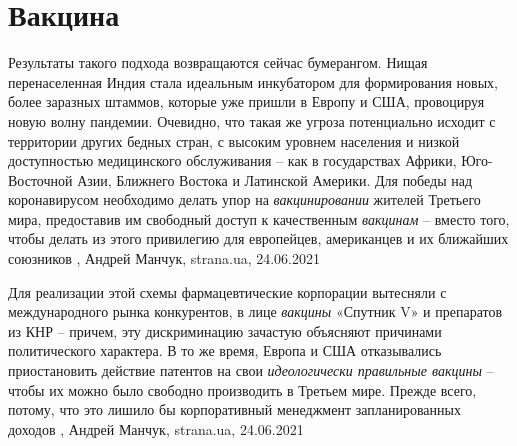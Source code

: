  
 
 
 
 
\chapter{Вакцина}
\label{sec:slova.vaccina}

Результаты такого подхода возвращаются сейчас бумерангом. Нищая перенаселенная
Индия стала идеальным инкубатором для формирования новых, более заразных
штаммов, которые уже пришли в Европу и США, провоцируя новую волну пандемии.
Очевидно, что такая же угроза потенциально исходит с территории других бедных
стран, с высоким уровнем населения и низкой доступностью медицинского
обслуживания – как в государствах Африки, Юго-Восточной Азии, Ближнего Востока
и Латинской Америки. Для победы над коронавирусом необходимо делать упор на
\emph{вакцинировании} жителей Третьего мира, предоставив им свободный доступ к
качественным \emph{вакцинам} – вместо того, чтобы делать из этого привилегию для
европейцев, американцев и их ближайших союзников
, 
Андрей Манчук, strana.ua, 24.06.2021

Для реализации этой схемы фармацевтические корпорации вытесняли с
международного рынка конкурентов, в лице \emph{вакцины} «Спутник V» и препаратов из
КНР – причем, эту дискриминацию зачастую объясняют причинами политического
характера. В то же время, Европа и США отказывались приостановить действие
патентов на свои \emph{идеологически правильные вакцины} – чтобы их можно было
свободно производить в Третьем мире. Прежде всего, потому, что это лишило бы
корпоративный менеджмент запланированных доходов
, 
Андрей Манчук, strana.ua, 24.06.2021

